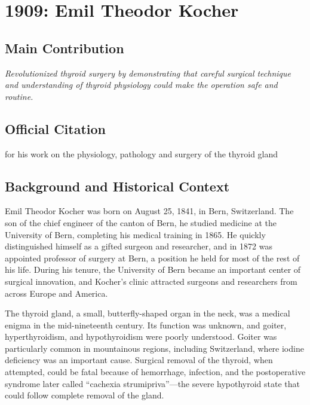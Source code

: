 \chapter[1909 --- Kocher]{1909: Emil Theodor Kocher}
\label{ch:1909_emiltheodorkocher}

\section*{Main Contribution}

\textit{Revolutionized thyroid surgery by demonstrating that careful surgical technique and understanding of thyroid physiology could make the operation safe and routine.}\cite{nobel-1909,lecture-1909}

\section{Official Citation}

for his work on the physiology, pathology and surgery of the thyroid gland

\section{Background and Historical Context}

Emil Theodor Kocher was born on August 25, 1841, in Bern, Switzerland. The son of the chief engineer of the canton of Bern, he studied medicine at the University of Bern, completing his medical training in 1865. He quickly distinguished himself as a gifted surgeon and researcher, and in 1872 was appointed professor of surgery at Bern, a position he held for most of the rest of his life. During his tenure, the University of Bern became an important center of surgical innovation, and Kocher's clinic attracted surgeons and researchers from across Europe and America.

The thyroid gland, a small, butterfly-shaped organ in the neck, was a medical enigma in the mid-nineteenth century. Its function was unknown, and goiter, hyperthyroidism, and hypothyroidism were poorly understood. Goiter was particularly common in mountainous regions, including Switzerland, where iodine deficiency was an important cause. Surgical removal of the thyroid, when attempted, could be fatal because of hemorrhage, infection, and the postoperative syndrome later called ``cachexia strumipriva''---the severe hypothyroid state that could follow complete removal of the gland.

